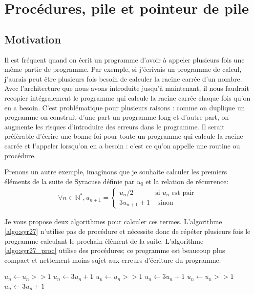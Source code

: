 
\chapter{Procédures, pile et pointeur de pile}



\section{Motivation}

Il est fréquent quand on écrit un programme d'avoir à appeler plusieurs fois une même partie de programme. Par exemple, si j'écrivais un programme de calcul, j'aurais peut être plusieurs fois besoin de calculer la racine carrée d'un nombre. Avec l'architecture que nous avons introduite jusqu'à maintenant, il nous faudrait recopier intégralement le programme qui calcule la racine carrée chaque fois qu'on en a besoin. C'est problématique pour plusieurs raisons : comme on duplique un programme on construit d'une part un programme long et d'autre part, on augmente les risques d'introduire des erreurs dans le programme. Il serait préférable d'écrire une bonne foi pour toute un programme qui calcule la racine carrée et l'appeler lorsqu'on en a besoin : c'est ce qu'on appelle une routine ou procédure. 

Prenons un autre exemple, imaginons que je souhaite calculer les premiers éléments de la suite de Syracuse définie par $u_0$ et la relation de récurrence:
\begin{eqnarray*}
\forall n \in \mathbb{N}^*, u_{n+1} =
\begin{cases}
u_n/2 & \mbox{si } u_n \mbox{ est pair}\\
3u_{n+1}+1 & \mbox{ sinon}
\end{cases}
\end{eqnarray*}

Je vous propose deux algorithmes pour calculer ces termes. L'algorithme \ref{algo:syr27} n'utilise pas de procédure et nécessite donc de répéter plusieurs fois le programme calculant le prochain élément de la suite. L'algorithme \ref{algo:syr27_proc} utilise des procédures; ce programme est beaucoup plus compact et nettement moins sujet aux erreurs d'écriture du programme.

\begin{algorithm}
\caption{ \label{algo:syr27}}
\begin{algorithmic}[1]
 
\State $u_n \gets u_n >> 1$
\Else
\State $u_n \gets 3 u_n + 1$
\EndIf
{} 
\State $u_n \gets u_n >> 1$
\Else
\State $u_n \gets 3 u_n + 1$
\EndIf
{} 
\State $u_n \gets u_n >> 1$
\Else
\State $u_n \gets 3 u_n + 1$
\EndIf
\EndFunction
\end{algorithmic}
\end{algorithm}


